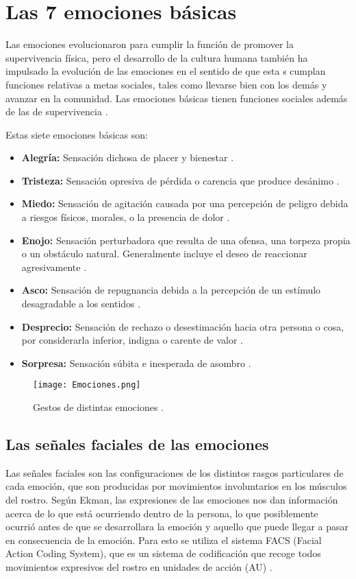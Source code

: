 \section*{Las 7 emociones básicas}
Las emociones evolucionaron para cumplir la función de promover la supervivencia física, pero el desarrollo de la cultura humana también ha impulsado la evolución de las emociones en el sentido de que esta
s cumplan funciones relativas a metas sociales, tales como llevarse bien con los demás y avanzar en la comunidad. Las emociones básicas tienen funciones sociales además de las de supervivencia \cite{rulicki2012cnv}.

Estas siete emociones básicas son:
\begin{itemize}
\item \textbf{Alegría:} Sensación dichosa de placer y bienestar \cite{rulicki2012cnv}.
\item \textbf{Tristeza:} Sensación opresiva de pérdida o carencia que produce desánimo \cite{rulicki2012cnv}.
\item \textbf{Miedo:} Sensación de agitación causada por una percepción de peligro debida a riesgos físicos, morales, o la presencia de dolor \cite{rulicki2012cnv}.
\item \textbf{Enojo:} Sensación perturbadora que resulta de una ofensa, una torpeza propia o un obstáculo natural. Generalmente incluye el deseo de reaccionar agresivamente \cite{rulicki2012cnv}.
\item \textbf{Asco:} Sensación de repugnancia debida a la percepción de un estímulo desagradable a los sentidos \cite{rulicki2012cnv}.
\item \textbf{Desprecio:} Sensación de rechazo o desestimación hacia otra persona o cosa, por considerarla inferior, indigna o carente de valor \cite{rulicki2012cnv}.
\item \textbf{Sorpresa:} Sensación súbita e inesperada de asombro \cite{rulicki2012cnv}.
\end{itemize}

\begin{figure}[h]
    \centering
    \texttt{[image: Emociones.png]}
    \caption{Gestos de distintas emociones \cite{ekman2017rostro}.}
    \label{fig:Emociones}
\end{figure}

\subsection*{Las señales faciales de las emociones}
Las señales faciales son las configuraciones de los distintos rasgos particulares de cada emoción, que son producidas por movimientos involuntarios en los músculos del rostro. Según Ekman, las expresiones de las emociones nos dan información acerca de lo que está ocurriendo dentro de la persona, lo que posiblemente ocurrió antes de que se desarrollara la emoción y aquello que puede llegar a pasar en consecuencia de la emoción. Para esto se utiliza el sistema FACS (Facial Action Coding System), que es un sistema de codificación que recoge todos movimientos expresivos del rostro en unidades de acción (AU) \cite{ekman2017rostro}.

